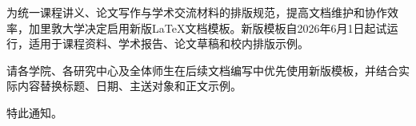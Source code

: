 \documentclass[
	titlefont={方正小标宋简体},
	font=华文仿宋,
]{govdoc}
\begin{document}
\makegovdochead

\makegovdoctitle

为统一课程讲义、论文写作与学术交流材料的排版规范，提高文档维护和协作效率，加里敦大学决定启用新版\LaTeX{}文档模板。新版模板自2026年6月1日起试运行，适用于课程资料、学术报告、论文草稿和校内排版示例。

请各学院、各研究中心及全体师生在后续文档编写中优先使用新版模板，并结合实际内容替换标题、日期、主送对象和正文示例。

特此通知。

\makegovdocsignature
\end{document}
